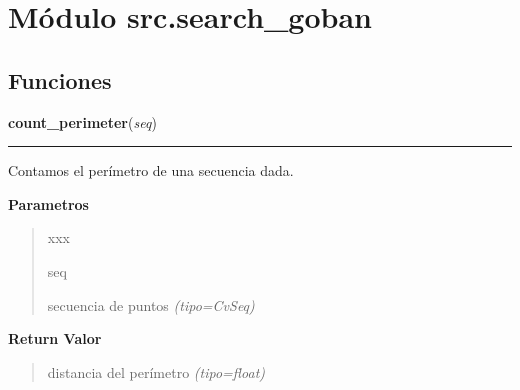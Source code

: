 %
%
%


\section{Módulo src.search\_goban}

    \label{src:search_goban}


  \subsection{Funciones}

    \label{src:search_goban:count_perimeter}

    \vspace{0.5ex}

\hspace{.8\funcindent}\begin{boxedminipage}{\funcwidth}

    \raggedright \textbf{count\_perimeter}(\textit{seq})

    \vspace{-1.5ex}

    \rule{\textwidth}{0.5\fboxrule}
\setlength{\parskip}{2ex}
Contamos el perímetro de una secuencia dada.

\setlength{\parskip}{1ex}
      \textbf{Parametros}
      \vspace{-1ex}

      \begin{quote}
        \begin{Ventry}{xxx}

          \item[seq]


secuencia de puntos
            {\it (tipo=CvSeq)}

        \end{Ventry}

      \end{quote}

      \textbf{Return Valor}
    \vspace{-1ex}

      \begin{quote}

distancia del perímetro
      {\it (tipo=float)}

      \end{quote}

    \end{boxedminipage}

